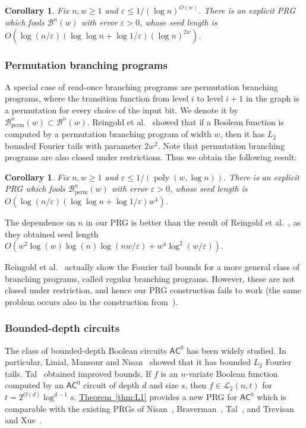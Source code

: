 \documentclass[11pt]{article}
\numberwithin{equation}{section}
\newtheorem{corollary}[theorem]{Corollary}
\theoremstyle{definition}
\theoremstyle{plain}
\newcommand{\cclass}[1]{\textsf{#1}}
\newcommand{\expref}[2]{\hyperref[#2]{#1~\ref{#2}}}
\newcommand{\LL}{\mathcal{L}}
\newcommand{\BB}{\mathcal{B}}
\DeclareMathOperator{\perm}{perm}           %
\newcommand{\BBperm}{\mathcal{B}_{\perm}}    %
\newcommand{\eps}{\varepsilon}
\DeclareMathOperator{\poly}{poly}      %
\begin{document}
\begin{corollary}
\label{cor:ROBP}
	Fix $n,w \ge 1$ and $\eps\leq 1/(\log n)^{O(w)}$. There is an explicit PRG which fools $\BB^n(w)$ with error $\eps>0$,
whose seed length is $O(\log (n/\eps) (\log \log n + \log 1/\eps) (\log n)^{2w})$.
\end{corollary}


\subsubsection{Permutation branching programs}
A special case of read-once branching programs are permutation branching programs, where the transition function from level $i$
to level $i+1$ in the graph is a permutation for every choice of the input bit. We denote it by $\BBperm^n(w) \subset \BB^n(w)$.
Reingold {et al.}~\cite{reingold2013pseudorandomness} showed that if a Boolean function
is computed by a permutation branching program of width $w$, then it has $L_2$ bounded Fourier tails with parameter $2 w^2$.
Note that permutation branching programs are also closed under restrictions. Thus we obtain the following result:

\begin{corollary}
\label{cor:perm_BP}
	Fix $n,w \ge 1$ and $\eps\leq 1/(\poly(w, \log n))$. There is an explicit PRG which fools $\BBperm^n(w)$ with error $\eps>0$,
whose seed length is $O(\log (n/\eps) (\log \log n + \log 1/\eps) w^4)$.
\end{corollary}
%
%
The dependence on $n$ in our PRG is better than the result of Reingold et al.~\cite{reingold2013pseudorandomness},
as they obtained seed length $O(w^2 \log(w) \log(n) \log(nw/\eps) + w^4 \log^2(w/\eps))$.

%
%
Reingold et al.~\cite{reingold2013pseudorandomness} actually show the Fourier tail bounds for a more general
class of branching programs, called regular branching programs. However, these are not closed under restriction,
%
%
and hence our PRG construction fails to work (the same problem occurs also in the construction from~\cite{reingold2013pseudorandomness}).

%
\subsubsection{Bounded-depth circuits}   %
The class of bounded-depth Boolean circuits $\cclass{AC}^0$ has been widely studied. In particular, Linial, Mansour and Nisan~\cite{linial1993constant} showed that it has bounded $L_2$ Fourier tails. Tal~\cite{tal2017tight} obtained improved
bounds. If $f$ is an $n$-variate Boolean function computed by an $\cclass{AC}^0$ circuit of depth $d$ and size $s$,
then $f \in \LL_2(n,t)$ for $t=2^{O(d)}\log^{d-1}s$. \expref{Theorem}{thm:L1} provides a new PRG for $\cclass{AC}^0$ which is comparable
with the existing PRGs of Nisan~\cite{nisan1991pseudorandom}, Braverman~\cite{braverman2010polylogarithmic}, Tal~\cite{tal2017tight}, and Trevisan and Xue~\cite{trevisan2013derandomized}.
\end{document}
